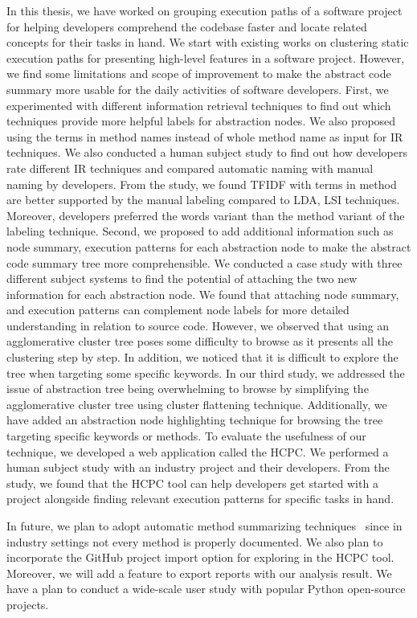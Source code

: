 \label{chapter:conclusion}
In this thesis, we have worked on grouping execution paths of a software project for helping developers comprehend the codebase faster and locate related concepts for their tasks in hand. We start with existing works on clustering static execution paths for presenting high-level features in a software project. However, we find some limitations and scope of improvement to make the abstract code summary more usable for the daily activities of software developers. First, we experimented with different information retrieval techniques to find out which techniques provide more helpful labels for abstraction nodes. We also proposed using the terms in method names instead of whole method name as input for IR techniques. We also conducted a human subject study to find out how developers rate different IR techniques and compared automatic naming with manual naming by developers. From the study, we found TFIDF with terms in method are better supported by the manual labeling compared to LDA, LSI techniques. Moreover, developers preferred the words variant than the method variant of the labeling technique. Second, we proposed to add additional information such as node summary, execution patterns for each abstraction node to make the abstract code summary tree more comprehensible. We conducted a case study with three different subject systems to find the potential of attaching the two new information for each abstraction node. We found that attaching node summary, and execution patterns can complement node labels for more detailed understanding in relation to source code. However, we observed that using an agglomerative cluster tree poses some difficulty to browse as it presents all the clustering step by step. In addition, we noticed that it is difficult to explore the tree when targeting some specific keywords. In our third study, we addressed the issue of abstraction tree being overwhelming to browse by simplifying the agglomerative cluster tree using cluster flattening technique. Additionally, we have added an abstraction node highlighting technique for browsing the tree targeting specific keywords or methods. To evaluate the usefulness of our technique, we developed a web application called the HCPC. We performed a human subject study with an industry project and their developers. From the study, we found that the HCPC tool can help developers get started with a project alongside finding relevant execution patterns for specific tasks in hand.

In future, we plan to adopt automatic method summarizing techniques~\cite{wan2018improvingCodeSummary, ahmad2020transformerCodeSummary, zhu2019automaticSummaryReview} since in industry settings not every method is properly documented. We also plan to incorporate the GitHub project import option for exploring in the HCPC tool. Moreover, we will add a feature to export reports with our analysis result. We have a plan to conduct a wide-scale user study with popular Python open-source projects.

